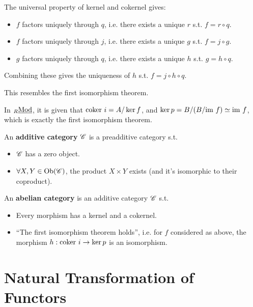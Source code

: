 \documentclass{article}
\begin{document}
The universal property of kernel and cokernel gives:
\begin{itemize}
    \item $f$ factors uniquely through $q$, i.e. there exists a unique $r$ s.t. $f = r \circ q$.
    \item $f$ factors uniquely through $j$, i.e. there exists a unique $g$ s.t. $f = j \circ g$.
    \item $g$ factors uniquely through $q$, i.e. there exists a unique $h$ s.t. $g = h \circ q$.
\end{itemize}

Combining these gives the uniqueness of $h$ s.t. $f = j \circ h \circ q$.

\begin{remark}
    This resembles the first isomorphism theorem. 
    
    In ${}_{R}\underline{\textup{Mod}}$, it is given that $\mathrm{coker}\  i = A / \ker f$, and $\ker p = B / (B / \mathrm{im}\  f) \simeq \mathrm{im}\  f$, which is exactly the first isomorphism theorem. 
\end{remark}

\begin{definition}
    An \textbf{additive category} $\mathscr{C}$ is a preadditive category s.t. 
    \begin{itemize}
        \item $\mathscr{C}$ has a zero object.
        \item $\forall X, Y \in \mathrm{Ob}(\mathscr{C})$, the product $X \times Y$ exists (and it's isomorphic to their coproduct).
    \end{itemize}
\end{definition}

\begin{definition}
    An \textbf{abelian category} is an additive category $\mathscr{C}$ s.t. 
    \begin{itemize}
        \item Every morphism has a kernel and a cokernel.
        \item ``The first isomorphism theorem holds'', i.e. for $f$ considered as above, the morphism $h: \mathrm{coker}\  i \to \ker p$ is an isomorphism. 
    \end{itemize}
\end{definition}

\section{Natural Transformation of Functors}
\end{document}
